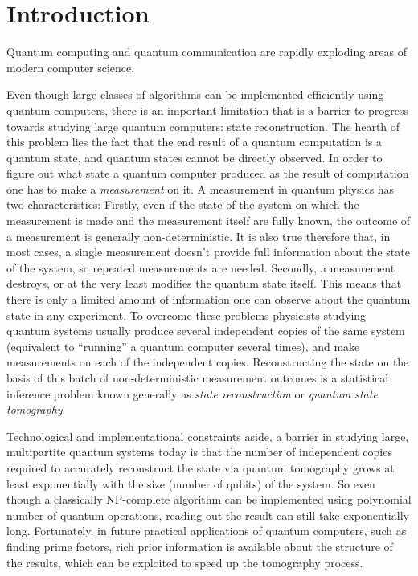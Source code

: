 
\section{Introduction}

Quantum computing and quantum communication are rapidly exploding areas of modern computer science.

Even though large classes of algorithms can be implemented efficiently using quantum computers, there is an important limitation that is a barrier to progress towards studying large quantum computers: state reconstruction. The hearth of this problem lies the fact that the end result of a quantum computation is a quantum state, and quantum states cannot be directly observed. In order to figure out what state a quantum computer produced as the result of computation one has to make a \emph{measurement} on it. A measurement in quantum physics has two characteristics: Firstly, even if the state of the system on which the measurement is made and the measurement itself are fully known, the outcome of a measurement is generally non-deterministic. It is also true therefore that, in most cases, a single measurement doesn't provide full information about the state of the system, so repeated measurements are needed. Secondly, a measurement destroys, or at the very least modifies the quantum state itself. This means that there is only a limited amount of information one can observe about the quantum state in any experiment. To overcome these problems physicists studying quantum systems usually produce several independent copies of the same system (equivalent to ``running'' a quantum computer several times), and make measurements on each of the independent copies. Reconstructing the state on the basis of this batch of non-deterministic measurement outcomes is a statistical inference problem known generally as \emph{state reconstruction} or \emph{quantum state tomography}.

Technological and implementational constraints aside, a barrier in studying large, multipartite quantum systems today is that the number of independent copies required to accurately reconstruct the state via quantum tomography grows at least exponentially with the size (number of qubits) of the system. So even though a classically NP-complete algorithm can be implemented using polynomial number of quantum operations, reading out the result can still take exponentially long. Fortunately, in future practical applications of quantum computers, such as finding prime factors, rich prior information is available about the structure of the results, which can be exploited to speed up the tomography process.

